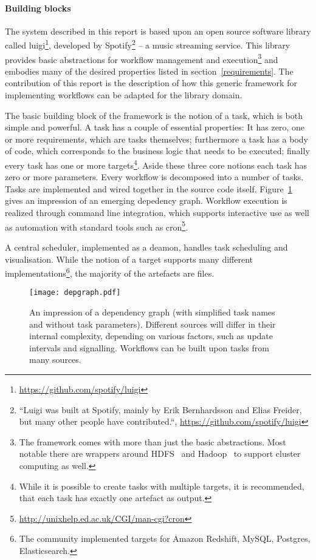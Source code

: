 \documentclass[english]{lni}
\begin{document}
\paragraph{Building blocks}

The system described in this report is based upon an open source software library called
luigi\footnote{\url{https://github.com/spotify/luigi}},
developed by Spotify\footnote{``Luigi was built at Spotify, mainly by Erik Bernhardsson and Elias Freider, but many other people have contributed.``, \url{https://github.com/spotify/luigi}} --
a music streaming service. This library provides
basic abstractions for workflow management and execution\footnote{The framework comes
with more than just the basic abstractions. Most notable there are wrappers around HDFS~\cite{borthakur2008hdfs} and
Hadoop~\cite{white2009hadoop} to support cluster computing as well.} and embodies many of
the desired properties listed in section~\ref{requirements}. The contribution
of this report is the description of how this generic framework for
implementing workflows can be adapted for the library domain.

The basic building block of the framework is the notion of a task, which is
both simple and powerful. A task has a couple of essential properties: It
has zero, one or more requirements, which are tasks themselves; furthermore
a task has a body of code, which corresponds to the business logic that needs to
be executed; finally every task has one or more targets\footnote{While it is possible to create tasks with multiple targets, it is recommended, that each task has exactly one artefact as output.}.
Aside these three core notions each task has zero or more parameters.
Every workflow is decomposed into a number of tasks. Tasks are implemented
and wired together in the source code itself. Figure~\ref{impression}
gives an impression of an emerging depedency graph. Workflow execution is realized through command line integration, which supports
interactive use as well as automation with standard tools such as cron\footnote{
\url{http://unixhelp.ed.ac.uk/CGI/man-cgi?cron}}.

A central scheduler, implemented as a deamon, handles task scheduling and visualisation. While the notion of a target supports many different implementations\footnote{The community implemented targets for Amazon Redshift, MySQL, Postgres, Elasticsearch.},
the majority of the artefacts are files.

\begin{figure}[ht!]
\centering
\texttt{[image: depgraph.pdf]}
\caption{An impression of a dependency graph (with simplified task names and without task parameters).
Different sources will differ in their internal complexity,
depending on various factors, such as update intervals and signalling. Workflows can
be built upon tasks from many sources.}
\label{impression}
\end{figure}
\end{document}
